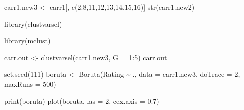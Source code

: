 \documentclass[
]{article}
\newenvironment{Shaded}{\begin{snugshade}}{\end{snugshade}}
\newcommand{\AttributeTok}[1]{\textcolor[rgb]{0.77,0.63,0.00}{#1}}
\newcommand{\DecValTok}[1]{\textcolor[rgb]{0.00,0.00,0.81}{#1}}
\newcommand{\FloatTok}[1]{\textcolor[rgb]{0.00,0.00,0.81}{#1}}
\newcommand{\FunctionTok}[1]{\textcolor[rgb]{0.00,0.00,0.00}{#1}}
\newcommand{\NormalTok}[1]{#1}
\newcommand{\OtherTok}[1]{\textcolor[rgb]{0.56,0.35,0.01}{#1}}
\newcommand{\SpecialCharTok}[1]{\textcolor[rgb]{0.00,0.00,0.00}{#1}}
\begin{document}
\begin{Shaded}
\begin{Highlighting}[]
\NormalTok{carr1.new3 }\OtherTok{\textless{}{-}}\NormalTok{ carr1[, }\FunctionTok{c}\NormalTok{(}\DecValTok{2}\SpecialCharTok{:}\DecValTok{8}\NormalTok{,}\DecValTok{11}\NormalTok{,}\DecValTok{12}\NormalTok{,}\DecValTok{13}\NormalTok{,}\DecValTok{14}\NormalTok{,}\DecValTok{15}\NormalTok{,}\DecValTok{16}\NormalTok{)]}
\FunctionTok{str}\NormalTok{(carr1.new2)}
\end{Highlighting}
\end{Shaded}

\begin{Shaded}
\begin{Highlighting}[]
\FunctionTok{library}\NormalTok{(clustvarsel)}
\end{Highlighting}
\end{Shaded}

\begin{Shaded}
\begin{Highlighting}[]
\FunctionTok{library}\NormalTok{(mclust)}
\end{Highlighting}
\end{Shaded}

\begin{Shaded}
\begin{Highlighting}[]
\NormalTok{carr.out }\OtherTok{\textless{}{-}} \FunctionTok{clustvarsel}\NormalTok{(carr1.new3, }\AttributeTok{G =} \DecValTok{1}\SpecialCharTok{:}\DecValTok{5}\NormalTok{)}
\NormalTok{carr.out}
\end{Highlighting}
\end{Shaded}

\begin{Shaded}
\end{Shaded}

\begin{Shaded}
\begin{Highlighting}[]
\FunctionTok{set.seed}\NormalTok{(}\DecValTok{111}\NormalTok{)}
\NormalTok{boruta }\OtherTok{\textless{}{-}} \FunctionTok{Boruta}\NormalTok{(Rating }\SpecialCharTok{\textasciitilde{}}\NormalTok{ ., }\AttributeTok{data =}\NormalTok{ carr1.new3, }\AttributeTok{doTrace =} \DecValTok{2}\NormalTok{, }\AttributeTok{maxRuns =} \DecValTok{500}\NormalTok{)}

\FunctionTok{print}\NormalTok{(boruta)}
\FunctionTok{plot}\NormalTok{(boruta, }\AttributeTok{las =} \DecValTok{2}\NormalTok{, }\AttributeTok{cex.axis =} \FloatTok{0.7}\NormalTok{)}
\end{Highlighting}
\end{Shaded}
\end{document}
